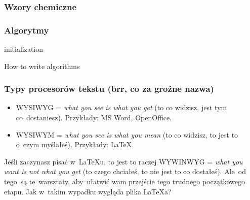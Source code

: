 \documentclass[10pt,t]{beamer}
\begin{document}
\begin{frame}[fragile]
  \frametitle{Wzory chemiczne}




\end{frame}





\begin{frame}[fragile]
  \frametitle{Algorytmy}


\begin{algorithm}[H]
 initialization\;
 \caption{How to write algorithms}
\end{algorithm}

\end{frame}





\begin{frame}
  \frametitle{Typy procesorów tekstu (brr, co za groźne nazwa)}


  \begin{itemize}
    \RaggedRight

  \item WYSIWYG = \textit{what you see is what you get} (to co
    widzisz, jest tym co~dostaniesz). Przykłady: MS Word,
    OpenOffice.

  \item WYSIWYM = \textit{what you see is what you mean} (to co
    widzisz, to jest to o~czym myślałeś). Przykłady: \LaTeX.

  \end{itemize}

  Jeśli zaczynasz pisać w~\LaTeX u, to jest to raczej WYWINWYG =
  \textit{what you want is not what you get} (to czego chciałeś, to
  nie jest to co dostałeś). Ale~od tego~są te~warsztaty, aby~ułatwić
  wam przejście tego trudnego początkowego etapu. Jak w~takim
  wypadku wygląda plika \LaTeX a?

\end{frame}
\end{document}
